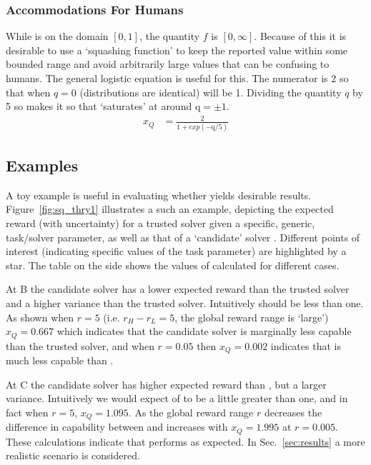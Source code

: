 \subsubsection{Accommodations For Humans}
While \hell{} is on the domain $[0,1]$, the quantity $f$ is $[0,\infty]$. Because of this it is desirable to use a `squashing function' to keep the reported \xQ{} value within some bounded range and avoid arbitrarily large values that can be confusing to humans. The general logistic equation is useful for this.
The numerator is 2 so that when $q=0$ (distributions are identical) \xQ{} will be 1. Dividing the quantity $q$ by 5 so makes it so that \xQ{} `saturates' at around $\text{q}=\pm1$.
\begin{align}
    x_{Q} &= \frac{2}{1+exp(-\text{q}/5)}\label{eq:SQ}
\end{align}

\subsection{Examples}
A toy example is useful in evaluating whether \xQ{} yields desirable results. Figure~\ref{fig:sq_thry1} illustrates a such an example, depicting the expected reward (with uncertainty) for a trusted solver \solvestar{} given a specific, generic, task/solver parameter, as well as that of a `candidate' solver \solve. Different points of interest (indicating specific values of the task parameter) are highlighted by a star. The table on the side shows the values of \xQ{} calculated for different cases.

At B the candidate solver has a lower expected reward than the trusted solver and a higher variance than the trusted solver. Intuitively \xQ{} should be less than one. As shown when $r=5$ (i.e. $r_H-r_L=5$, the global reward range is `large') $x_Q=0.667$ which indicates that the candidate solver is marginally less capable than the trusted solver, and when $r=0.05$ then $x_Q=0.002$ indicates that \solve{} is much less capable than \solvestar.

At C the candidate solver \solve{} has higher expected reward than \solvestar, but a larger variance. Intuitively we would expect \xQ{} of \solve{} to be a little greater than one, and in fact when $r=5$, $x_Q=1.095$. As the global reward range $r$ decreases the difference in capability between \solve{} and \solvestar{} increases with $x_Q=1.995$ at $r=0.005$. These calculations indicate that \xQ{} performs as expected. In Sec.~\ref{sec:results} a more realistic scenario is considered. 

